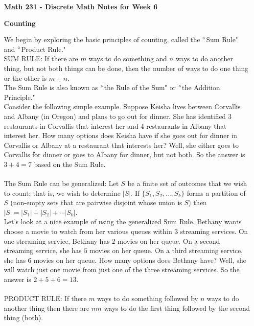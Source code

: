 \documentclass[12pt]{amsart}
\theoremstyle{definition}
\theoremstyle{remark}
\begin{document}
\textbf{Math 231 - Discrete Math \hfill{} Notes for Week 6}

\bigskip
\bigskip

\textbf{Counting}


\bigskip


 We begin by exploring the basic principles of counting, called the $``$Sum Rule" and $``$Product Rule."\\

SUM RULE:  If there are $m$ ways to do something and $n$ ways to do another thing, but not both things can be done, then the number of ways to do one thing or the other is $m+n$.\\

The Sum Rule is also known as $``$the Rule of the Sum" or $``$the Addition Principle."\\

Consider the following simple example.  Suppose Keisha lives between Corvallis and Albany (in Oregon) and plans to go out for dinner.  She has identified $3$ restaurants in Corvallis that interest her and $4$ restaurants in Albany that interest her.  How many options does Keisha have if she goes out for dinner in Corvallis or Albany at a restaurant that interests her?  Well, she either goes to Corvallis for dinner or goes to Albany for dinner, but not both.  So the answer is $3+4=7$ based on the Sum Rule.\\ \\

The Sum Rule can be generalized:  Let $S$ be a finite set of outcomes that we wish to count; that is, we wish to determine $|S|$.  If $\{S_1,S_2,...,S_k\}$ forms a partition of $S$ (non-empty sets that are pairwise disjoint whose union is $S$) then $|S|=|S_1|+|S_2|+\cdots |S_k|$.\\

Let's look at a nice example of using the generalized Sum Rule.  Bethany wants choose a movie to watch from her various queues within $3$ streaming services.  On one streaming service, Bethany has $2$ movies on her queue.  On a second streaming service, she has $5$ movies on her queue.  On a third streaming service, she has $6$ movies on her queue.  How many options does Bethany have?  Well, she will watch just one movie from just one of the three streaming services.  So the answer is $2+5+6=13$.\\ \\

PRODUCT RULE: If there $m$ ways to do something followed by $n$ ways to do another thing then there are $mn$ ways to do the first thing followed by the second thing (both).\\
\end{document}
